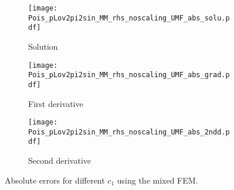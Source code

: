 \documentclass[final,3p]{elsarticle}
\begin{document}



\begin{figure}[!ht]
    \begin{subfigure}{5.5cm}
        \texttt{[image: Pois\_pLov2pi2sin\_MM\_rhs\_noscaling\_UMF\_abs\_solu.pdf]}
        \caption{Solution}
        \label{Fig:Pois_pLov2pi2sin_MM_rhs_noscaling_UMF_abs_solu}
    \end{subfigure}
    \begin{subfigure}{5.5cm}
        \texttt{[image: Pois\_pLov2pi2sin\_MM\_rhs\_noscaling\_UMF\_abs\_grad.pdf]}
        \caption{First derivative}
        \label{Fig:Pois_pLov2pi2sin_MM_rhs_noscaling_UMF_abs_grad}
    \end{subfigure}
    \begin{subfigure}{5.5cm}
        \texttt{[image: Pois\_pLov2pi2sin\_MM\_rhs\_noscaling\_UMF\_abs\_2ndd.pdf]}
        \caption{Second derivative}
        \label{Fig:Pois_pLov2pi2sin_MM_rhs_noscaling_UMF_abs_2ndd}
    \end{subfigure}
\caption{Absolute errors for different $c_1$ using the mixed FEM.}    
\label{Pois_pLov2pi2sin_MM_rhs orig}
\end{figure}
\end{document}
